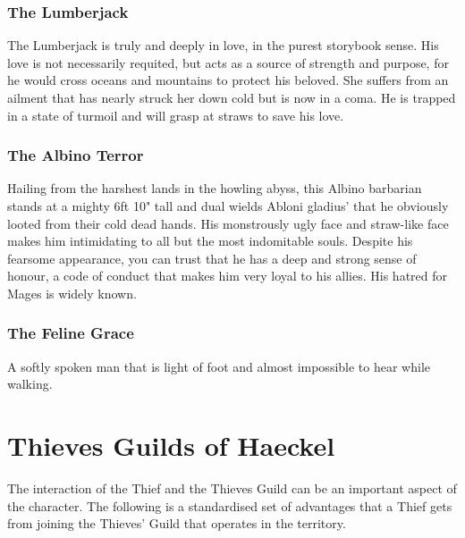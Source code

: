 \begin{multicols}{2}
\subsubsection{The Lumberjack} The Lumberjack is truly and deeply in love, in the purest storybook sense. His love is not necessarily requited, but acts as a source of strength and purpose, for he would cross oceans and mountains to protect his beloved. She suffers from an ailment that has nearly struck her down cold but is now in a coma. He is trapped in a state of turmoil and will grasp at straws to save his love. 
\subsubsection{The Albino Terror} Hailing from the harshest lands in the howling abyss, this Albino barbarian stands at a mighty 6ft 10" tall and dual wields Abloni gladius' that he obviously looted from their cold dead hands. His monstrously ugly face and straw-like face makes him intimidating to all but the most indomitable souls. Despite his fearsome appearance, you can trust that he has a deep and strong sense of honour, a code of conduct that makes him very loyal to his allies. His hatred for Mages is widely known.
\subsubsection{The Feline Grace} A softly spoken man that is light of foot and almost impossible to hear while walking. 

\section{Thieves Guilds of Haeckel}

The interaction of the Thief and the Thieves Guild can be an important aspect of the character. The following is a standardised set of advantages that a Thief gets from joining the Thieves' Guild that operates in the territory.


\end{multicols}
